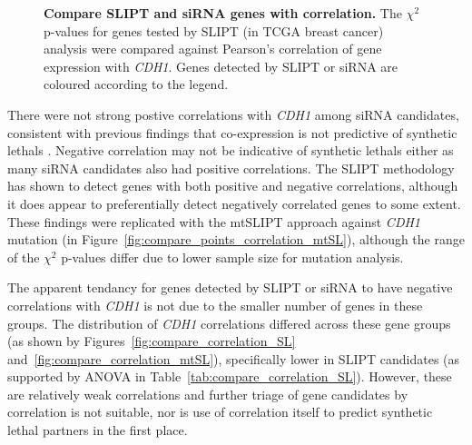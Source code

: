 \begin{figure}[!htp]
\begin{center}
   \end{center}
   \caption[Compare SLIPT and \gls{siRNA} genes with correlation]{\small \textbf{Compare \gls{SLIPT} and \gls{siRNA} genes with correlation.} The $\chi^2$ p-values for genes tested by \gls{SLIPT} (in \gls{TCGA} breast cancer)  analysis were compared against Pearson's correlation of \gls{gene expression} with \textit{CDH1}. Genes detected by \gls{SLIPT} or \gls{siRNA} are coloured according to the legend. 
}
\label{fig:compare_points_correlation_SL}
\end{figure}

There were not strong postive correlations with \textit{CDH1} among \gls{siRNA} candidates, consistent with previous findings that co-expression is not predictive of \glspl{synthetic lethal} \citep{Jerby2014, Lu2015}. Negative correlation may not be indicative of \glspl{synthetic lethal} either as many \gls{siRNA} candidates also had positive correlations. The \gls{SLIPT} methodology has shown to detect genes with both positive and negative correlations, although it does appear to preferentially detect negatively correlated genes to some extent. These findings were replicated with the \acrshort{mtSLIPT} approach against \textit{CDH1} \gls{mutation} (in Figure~\ref{fig:compare_points_correlation_mtSL}), although the range of the $\chi^2$ p-values differ due to lower sample size for \gls{mutation} analysis.

The apparent tendancy for genes detected by \gls{SLIPT} or \gls{siRNA} to have negative correlations with \textit{CDH1}  is not due to the smaller number of genes in these groups. The distribution of \textit{CDH1} correlations differed across these gene groups (as shown by Figures~\ref{fig:compare_correlation_SL} and~\ref{fig:compare_correlation_mtSL}), specifically lower in \gls{SLIPT} candidates (as supported by \gls{ANOVA} in Table~\ref{tab:compare_correlation_SL}). However, these are relatively weak correlations and further triage of gene candidates by correlation is not suitable, nor is use of correlation itself to predict \gls{synthetic lethal} partners in the first place.

